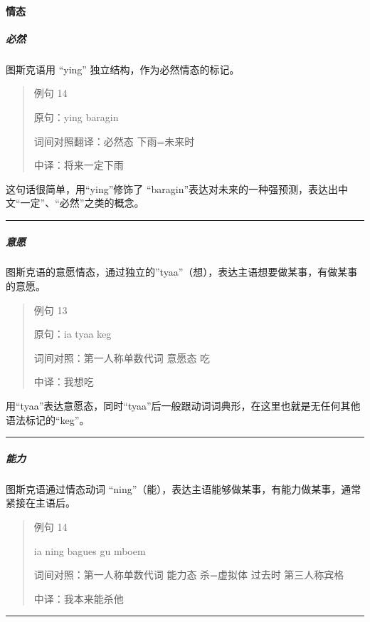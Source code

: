 \documentclass{article}
\begin{document}
\paragraph{情态}\label{ux60c5ux6001}

\subparagraph{必然}\label{ux5fc5ux7136}

图斯克语用 ``ying'' 独立结构，作为必然情态的标记。

\begin{quote}
例句 14

原句：ying baragin

词间对照翻译：必然态 下雨=未来时

中译：将来一定下雨
\end{quote}

这句话很简单，用``ying''修饰了
``baragin''表达对未来的一种强预测，表达出中文``一定''、``必然''之类的概念。

\begin{center}\rule{0.5\linewidth}{0.5pt}\end{center}

\subparagraph{意愿}\label{ux610fux613f}

图斯克语的意愿情态，通过独立的''tyaa''（想），表达主语想要做某事，有做某事的意愿。

\begin{quote}
例句 13

原句：ia tyaa keg

词间对照：第一人称单数代词 意愿态 吃

中译：我想吃
\end{quote}

用``tyaa''表达意愿态，同时``tyaa''后一般跟动词词典形，在这里也就是无任何其他语法标记的``keg''。

\begin{center}\rule{0.5\linewidth}{0.5pt}\end{center}

\subparagraph{能力}\label{ux80fdux529b}

图斯克语通过情态动词
``ning''（能），表达主语能够做某事，有能力做某事，通常紧接在主语后。

\begin{quote}
例句 14

ia ning bagues gu mboem

词间对照：第一人称单数代词 能力态 杀=虚拟体 过去时 第三人称宾格

中译：我本来能杀他
\end{quote}

\begin{center}\rule{0.5\linewidth}{0.5pt}\end{center}
\end{document}
